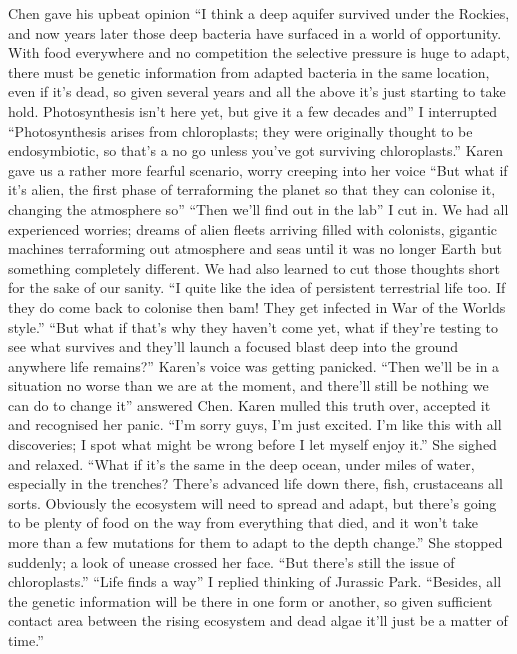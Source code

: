 \documentclass[a4paper]{article}
\begin{document}
Chen gave his upbeat opinion “I think a deep aquifer survived under the Rockies, and now years later those deep bacteria have surfaced in a world of opportunity. With food everywhere and no competition the selective pressure is huge to adapt, there must be genetic information from adapted bacteria in the same location, even if it’s dead, so given several years and all the above it’s just starting to take hold. Photosynthesis isn’t here yet, but give it a few decades and”
I interrupted “Photosynthesis arises from chloroplasts; they were originally thought to be endosymbiotic, so that’s a no go unless you’ve got surviving chloroplasts.”
Karen gave us a rather more fearful scenario, worry creeping into her voice “But what if it’s alien, the first phase of terraforming the planet so that they can colonise it, changing the atmosphere so”
“Then we’ll find out in the lab” I cut in. We had all experienced worries; dreams of alien fleets arriving filled with colonists, gigantic machines terraforming out atmosphere and seas until it was no longer Earth but something completely different. We had also learned to cut those thoughts short for the sake of our sanity. “I quite like the idea of persistent terrestrial life too. If they do come back to colonise then bam! They get infected in War of the Worlds style.”
“But what if that’s why they haven’t come yet, what if they’re testing to see what survives and they’ll launch a focused blast deep into the ground anywhere life remains?” Karen’s voice was getting panicked.
“Then we’ll be in a situation no worse than we are at the moment, and there’ll still be nothing we can do to change it” answered Chen. Karen mulled this truth over, accepted it and recognised her panic.
“I’m sorry guys, I’m just excited. I’m like this with all discoveries; I spot what might be wrong before I let myself enjoy it.” She sighed and relaxed. “What if it’s the same in the deep ocean, under miles of water, especially in the trenches? There’s advanced life down there, fish, crustaceans all sorts. Obviously the ecosystem will need to spread and adapt, but there’s going to be plenty of food on the way from everything that died, and it won’t take more than a few mutations for them to adapt to the depth change.” She stopped suddenly; a look of unease crossed her face. “But there’s still the issue of chloroplasts.”
“Life finds a way” I replied thinking of Jurassic Park. “Besides, all the genetic information will be there in one form or another, so given sufficient contact area between the rising ecosystem and dead algae it’ll just be a matter of time.”
\end{document}
